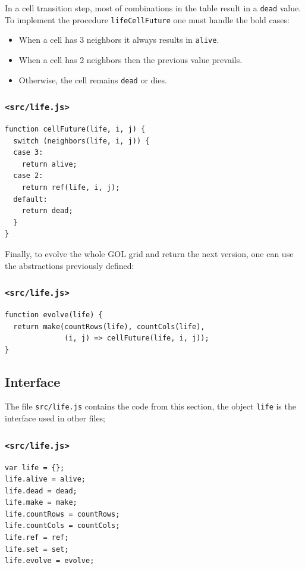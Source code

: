 \documentclass[11pt]{article}
\begin{document}
In a cell transition step, most of combinations in the table result in a \texttt{dead} value. To implement the procedure \texttt{lifeCellFuture} one must handle the bold cases:
\begin{itemize}
\item When a cell has 3 neighbors it always results in \texttt{alive}.
\item When a cell has 2 neighbors then the previous value prevails.
\item Otherwise, the cell remains \texttt{dead} or dies.
\end{itemize}
\subsubsection{\texttt{<src/life.js>}}
\label{sec:orgb0f489c}
\begin{verbatim}
function cellFuture(life, i, j) {
  switch (neighbors(life, i, j)) {
  case 3:
    return alive;
  case 2:
    return ref(life, i, j);
  default:
    return dead;
  }
}
\end{verbatim}

Finally, to evolve the whole GOL grid and return the next version, one can use the abstractions previously defined:

\subsubsection{\texttt{<src/life.js>}}
\label{sec:orgdc60d5c}
\begin{verbatim}
function evolve(life) {
  return make(countRows(life), countCols(life),
              (i, j) => cellFuture(life, i, j));
}
\end{verbatim}

\subsection{Interface}
\label{sec:org197b85a}

The file \texttt{src/life.js} contains the code from this section, the object \texttt{life} is the interface used in other files;

\subsubsection{\texttt{<src/life.js>}}
\label{sec:orgfd8aa97}
\begin{verbatim}
var life = {};
life.alive = alive;
life.dead = dead;
life.make = make;
life.countRows = countRows;
life.countCols = countCols;
life.ref = ref;
life.set = set;
life.evolve = evolve;
\end{verbatim}
\end{document}
